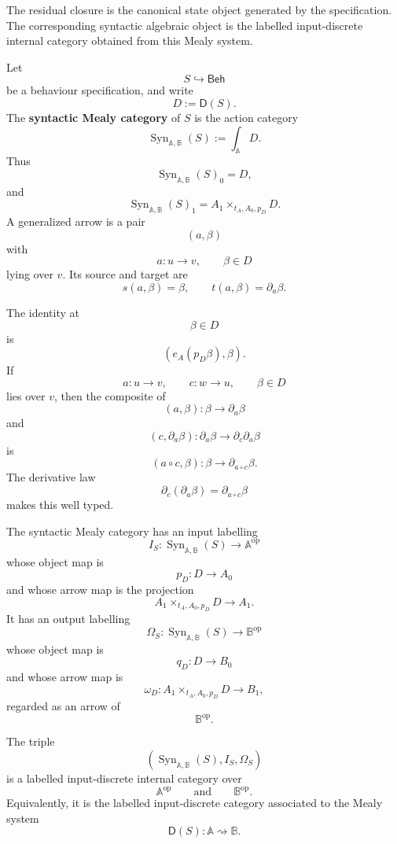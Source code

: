 The residual closure is the canonical state object generated by the
specification. The corresponding syntactic algebraic object is the labelled
input-discrete internal category obtained from this Mealy system.

\begin{definition}
\label{def:syntactic-mealy-category}
Let
\[
S\hookrightarrow\mathsf{Beh}
\]
be a behaviour specification, and write
\[
D:=\mathsf D(S).
\]
The \textbf{syntactic Mealy category} of \(S\) is the action category
\[
\operatorname{Syn}_{\mathbb A,\mathbb B}(S)
:=
\int_{\mathbb A}D.
\]
Thus
\[
\operatorname{Syn}_{\mathbb A,\mathbb B}(S)_0
=
D,
\]
and
\[
\operatorname{Syn}_{\mathbb A,\mathbb B}(S)_1
=
A_1\times_{t_A,A_0,p_D}D.
\]
A generalized arrow is a pair
\[
(a,\beta)
\]
with
\[
a:u\to v,
\qquad
\beta\in D
\]
lying over \(v\). Its source and target are
\[
s(a,\beta)=\beta,
\qquad
t(a,\beta)=\partial_a\beta.
\]
\end{definition}

The identity at
\[
\beta\in D
\]
is
\[
(e_A(p_D\beta),\beta).
\]
If
\[
a:u\to v,
\qquad
c:w\to u,
\qquad
\beta\in D
\]
lies over \(v\), then the composite of
\[
(a,\beta):\beta\to\partial_a\beta
\]
and
\[
(c,\partial_a\beta):\partial_a\beta\to\partial_c\partial_a\beta
\]
is
\[
(a\circ c,\beta):\beta\to\partial_{a\circ c}\beta.
\]
The derivative law
\[
\partial_c(\partial_a\beta)=\partial_{a\circ c}\beta
\]
makes this well typed.

\begin{definition}
\label{def:syntactic-mealy-category-labellings}
The syntactic Mealy category has an input labelling
\[
I_S:
\operatorname{Syn}_{\mathbb A,\mathbb B}(S)
\to
\mathbb A^{\mathrm{op}}
\]
whose object map is
\[
p_D:D\to A_0
\]
and whose arrow map is the projection
\[
A_1\times_{t_A,A_0,p_D}D\to A_1.
\]
It has an output labelling
\[
\Omega_S:
\operatorname{Syn}_{\mathbb A,\mathbb B}(S)
\to
\mathbb B^{\mathrm{op}}
\]
whose object map is
\[
q_D:D\to B_0
\]
and whose arrow map is
\[
\omega_D:
A_1\times_{t_A,A_0,p_D}D\to B_1,
\]
regarded as an arrow of
\[
\mathbb B^{\mathrm{op}}.
\]
\end{definition}

\begin{proposition}
\label{prop:syntactic-category-labelled-input-discrete}
The triple
\[
\left(
\operatorname{Syn}_{\mathbb A,\mathbb B}(S),
I_S,
\Omega_S
\right)
\]
is a labelled input-discrete internal category over
\[
\mathbb A^{\mathrm{op}}
\qquad\text{and}\qquad
\mathbb B^{\mathrm{op}}.
\]
Equivalently, it is the labelled input-discrete category associated to the
Mealy system
\[
\mathsf D(S):\mathbb A\rightsquigarrow\mathbb B.
\]
\end{proposition}

